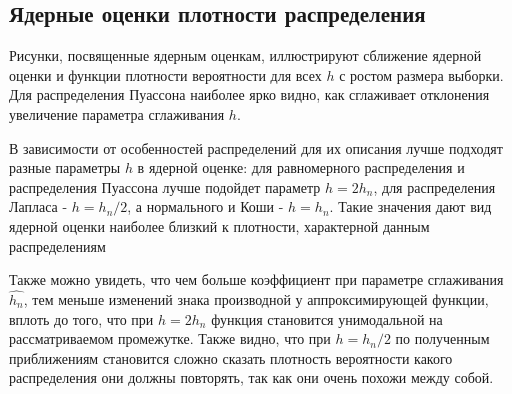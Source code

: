 \subsection{Ядерные оценки плотности распределения}
Рисунки, посвященные ядерным оценкам, иллюстрируют сближение ядерной оценки и функции плотности вероятности для всех $h$ с ростом размера
выборки. Для распределения Пуассона наиболее ярко видно, как сглаживает отклонения увеличение параметра сглаживания $h$.

В зависимости от особенностей распределений для их описания лучше подходят разные параметры $h$ в ядерной оценке: для равномерного распределения и распределения Пуассона лучше подойдет параметр $h = 2h_n$, для распределения Лапласа - $h = h_n/2$, а нормального и Коши - $h = h_n$.
Такие значения дают вид ядерной оценки наиболее близкий к плотности,
характерной данным распределениям

Также можно увидеть, что чем больше коэффициент при параметре сглаживания $\hat{h_n}$, тем меньше изменений знака производной у аппроксимирующей функции, вплоть до того, что при $h = 2h_n$ функция становится унимодальной на рассматриваемом промежутке. Также видно, что при $h = h_n / 2$
по полученным приближениям становится сложно сказать плотность вероятности какого распределения они должны повторять, так как они очень
похожи между собой.